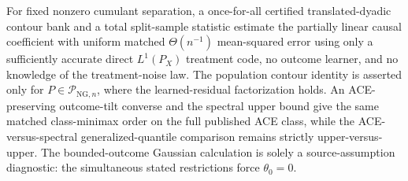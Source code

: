 For fixed nonzero cumulant separation, a once-for-all certified translated-dyadic contour bank and a total split-sample statistic estimate the partially linear causal coefficient with uniform matched \(\Theta(n^{-1})\) mean-squared error using only a sufficiently accurate direct \(L^1(P_X)\) treatment code, no outcome learner, and no knowledge of the treatment-noise law.  The population contour identity is asserted only for \(P\in\mathcal P_{\mathrm{NG},n}\), where the learned-residual factorization holds.  An ACE-preserving outcome-tilt converse and the spectral upper bound give the same matched class-minimax order on the full published ACE class, while the ACE-versus-spectral generalized-quantile comparison remains strictly upper-versus-upper.  The bounded-outcome Gaussian calculation is solely a source-assumption diagnostic: the simultaneous stated restrictions force \(\theta_0=0\).